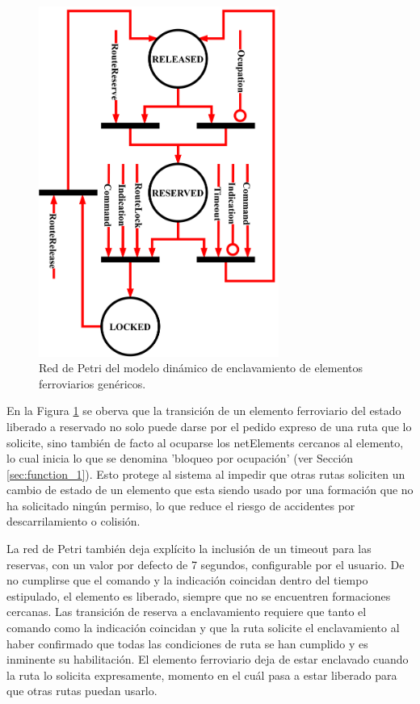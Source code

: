 	\begin{figure}[H]
		\centering
		\includegraphics[width=0.7\textwidth]{Figuras/INT_petri}
		\centering\caption{Red de Petri del modelo dinámico de enclavamiento de elementos ferroviarios genéricos.}
		\label{fig:Interlocking_petri}
	\end{figure}
	
	En la Figura \ref{fig:Interlocking_petri} se oberva que la transición de un elemento ferroviario del estado liberado a reservado no solo puede darse por el pedido expreso de una ruta que lo solicite, sino también de facto al ocuparse los netElements cercanos al elemento, lo cual inicia lo que se denomina 'bloqueo por ocupación' (ver Sección \ref{sec:function_1}). Esto protege al sistema al impedir que otras rutas soliciten un cambio de estado de un elemento que esta siendo usado por una formación que no ha solicitado ningún permiso, lo que reduce el riesgo de accidentes por descarrilamiento o colisión. 
	
	La red de Petri también deja explícito la inclusión de un timeout para las reservas, con un valor por defecto de 7 segundos, configurable por el usuario. De no cumplirse que el comando y la indicación coincidan dentro del tiempo estipulado, el elemento es liberado, siempre que no se encuentren formaciones cercanas. Las transición de reserva a enclavamiento requiere que tanto el comando como la indicación coincidan y que la ruta solicite el enclavamiento al haber confirmado que todas las condiciones de ruta se han cumplido y es inminente su habilitación. El elemento ferroviario deja de estar enclavado cuando la ruta lo solicita expresamente, momento en el cuál pasa a estar liberado para que otras rutas puedan usarlo.
	
